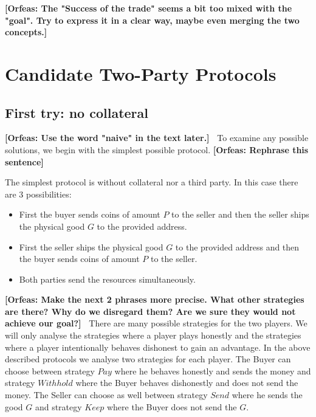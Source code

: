 \documentclass{cacthesis}
\newcommand{\authnote}[3]{{ \footnotesize \textbf{#1[#2: #3]~}}}
\newcommand{\orfnote}[1]{\authnote{\color{blue}}{Orfeas}{#1}}
\begin{document}
\orfnote{The "Success of the trade" seems a bit too mixed with the "goal". Try
to express it in a clear way, maybe even merging the two concepts.}


\chapter{Candidate Two-Party Protocols}


\section{First try: no collateral} \orfnote{ Use the word "naive" in the text later.}
To examine any possible solutions, we begin with the simplest possible
protocol. \orfnote{Rephrase this sentence}\newline

The simplest protocol is without collateral nor a third party. In this case there are 3 possibilities:
\begin{itemize}
	\item First the buyer sends coins of amount $P$ to the seller and then the seller ships the physical good $G$ to the provided address.
	\item First the seller ships the physical good $G$ to the provided address and then the buyer sends coins of amount $P$ to the seller.
	\item Both parties send the resources simultaneously.
\end{itemize}


 \orfnote{Make the next 2 phrases more precise.
What other strategies are there? Why do we disregard them? Are we sure they
would not achieve our goal?}
There are many possible strategies for the two players. We will only analyse the strategies where a player plays honestly and the strategies where a player intentionally behaves dishonest to gain an advantage.\newline
In the above described protocols we analyse two strategies for each player. The Buyer can choose between strategy $Pay$ where he behaves honestly and sends the money and strategy $Withhold$ where the Buyer behaves dishonestly and does not send the money. The Seller can choose as well between strategy $Send$ where he sends the good $G$ and strategy $Keep$ where the Buyer does not send the $G$.
\end{document}
